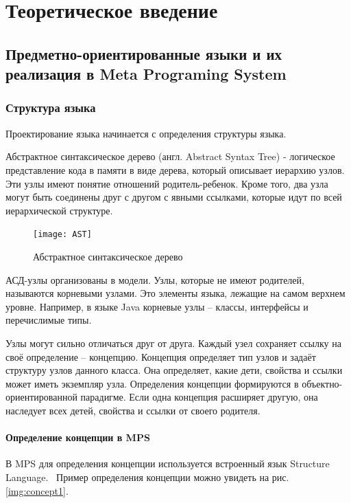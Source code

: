 \chapter{Теоретическое введение}
	
	
	
	\section{Предметно-ориентированные языки и их реализация в Meta Programing System}
		\subsection{Структура языка}

		Проектирование языка начинается с определения структуры языка.~\cite{mpssource}
		
		Абстрактное синтаксическое дерево (англ. Abstract Syntax Tree) - логическое представление кода в памяти в виде дерева, который описывает иерархию узлов. Эти узлы имеют понятие отношений родитель-ребенок. Кроме того, два узла могут быть соединены друг с другом с явными ссылками, которые идут по всей иерархической структуре.
		
		\begin{figure}[ht] 
			\center
			\texttt{[image: AST]}
			\caption{Абстрактное синтаксическое дерево} 
			\label{img:AST}  
		\end{figure}
	
		АСД-узлы организованы в модели. Узлы, которые не имеют родителей, называются корневыми узлами. Это элементы языка, лежащие на самом верхнем уровне. Например, в языке Java корневые узлы -- классы, интерфейсы и перечислимые типы.
		
		Узлы могут сильно отличаться друг от друга. Каждый узел сохраняет ссылку на своё определение -- концепцию. Концепция определяет тип узлов и задаёт структуру узлов данного класса. Она определяет, какие дети, свойства и ссылки может иметь экземпляр узла. Определения концепции формируются в объектно-ориентированной парадигме. Если одна концепция расширяет другую, она наследует всех детей, свойства и ссылки от своего родителя.
		
		\subsubsection{Определение концепции в MPS}
		
			В MPS для определения концепции используется встроенный язык Structure Language.~\cite{mpssource} Пример определения концепции можно увидеть на рис. \ref{img:concept1}.
			
